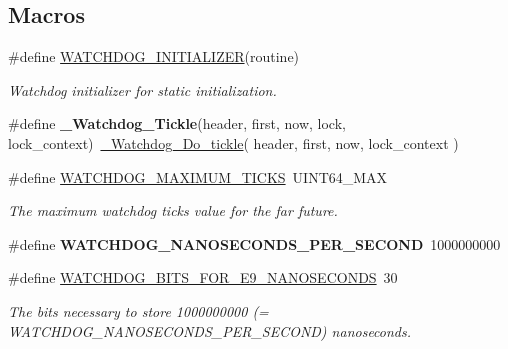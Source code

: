 \subsection*{Macros}
\begin{DoxyCompactItemize}
\item 
\#define \mbox{\hyperlink{group__RTEMSScoreWatchdog_gad9a70c605b99f006aa7f5cbaf84fb05c}{W\+A\+T\+C\+H\+D\+O\+G\+\_\+\+I\+N\+I\+T\+I\+A\+L\+I\+Z\+ER}}(routine)
\begin{DoxyCompactList}\small\item\em Watchdog initializer for static initialization. \end{DoxyCompactList}\item 
\mbox{\label{group__RTEMSScoreWatchdog_ga2770bf0813816a6abd06400a7557f71a}} 
\#define {\bfseries \+\_\+\+Watchdog\+\_\+\+Tickle}(header,  first,  now,  lock,  lock\+\_\+context)~\mbox{\hyperlink{group__RTEMSScoreWatchdog_gacedccfddf8d0838750b6272389b7aa86}{\+\_\+\+Watchdog\+\_\+\+Do\+\_\+tickle}}( header, first, now, lock\+\_\+context )
\item 
\mbox{\label{group__RTEMSScoreWatchdog_ga03c0fac43ff016ce0ddd8ddf6fc539a1}} 
\#define \mbox{\hyperlink{group__RTEMSScoreWatchdog_ga03c0fac43ff016ce0ddd8ddf6fc539a1}{W\+A\+T\+C\+H\+D\+O\+G\+\_\+\+M\+A\+X\+I\+M\+U\+M\+\_\+\+T\+I\+C\+KS}}~U\+I\+N\+T64\+\_\+\+M\+AX
\begin{DoxyCompactList}\small\item\em The maximum watchdog ticks value for the far future. \end{DoxyCompactList}\item 
\mbox{\label{group__RTEMSScoreWatchdog_ga394523ab157b227b3caaaa660bf55f22}} 
\#define {\bfseries W\+A\+T\+C\+H\+D\+O\+G\+\_\+\+N\+A\+N\+O\+S\+E\+C\+O\+N\+D\+S\+\_\+\+P\+E\+R\+\_\+\+S\+E\+C\+O\+ND}~1000000000
\item 
\#define \mbox{\hyperlink{group__RTEMSScoreWatchdog_ga117d7412e7bbbda451c962ef1b51829d}{W\+A\+T\+C\+H\+D\+O\+G\+\_\+\+B\+I\+T\+S\+\_\+\+F\+O\+R\+\_\+E9\+\_\+\+N\+A\+N\+O\+S\+E\+C\+O\+N\+DS}}~30
\begin{DoxyCompactList}\small\item\em The bits necessary to store 1000000000 (= W\+A\+T\+C\+H\+D\+O\+G\+\_\+\+N\+A\+N\+O\+S\+E\+C\+O\+N\+D\+S\+\_\+\+P\+E\+R\+\_\+\+S\+E\+C\+O\+ND) nanoseconds. \end{DoxyCompactList}\item 

\end{DoxyCompactItemize}

